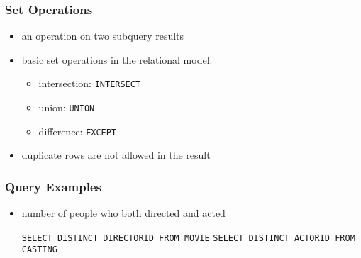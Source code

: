 \documentclass[dvipsnames]{beamer}
\theoremstyle{plain}
\begin{document}
\begin{frame}
  \frametitle{Set Operations}

  \begin{itemize}
    \item an operation on two subquery results

    \medskip
    \item basic set operations in the relational model:
    \begin{itemize}
      \item intersection: \lstinline!INTERSECT!
      \item union: \lstinline!UNION!
      \item difference: \lstinline!EXCEPT!
    \end{itemize}

    \item duplicate rows are not allowed in the result
  \end{itemize}
\end{frame}

\begin{frame}[fragile]
  \frametitle{Query Examples}

  \begin{itemize}
  \item number of people who both directed and acted

  \medskip
{}
\lstinline!SELECT DISTINCT DIRECTORID FROM MOVIE!
\lstinline!SELECT DISTINCT ACTORID FROM CASTING!
  \end{itemize}
\end{frame}
\end{document}
